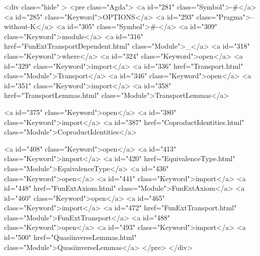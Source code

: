   <div class="hide" >
<pre class="Agda">
<a id="281" class="Symbol">{-#</a> <a id="285" class="Keyword">OPTIONS</a> <a id="293" class="Pragma">--without-K</a> <a id="305" class="Symbol">#-}</a>
<a id="309" class="Keyword">module</a> <a id="316" href="FunExtTransportDependent.html" class="Module">_</a> <a id="318" class="Keyword">where</a>
<a id="324" class="Keyword">open</a> <a id="329" class="Keyword">import</a> <a id="336" href="Transport.html" class="Module">Transport</a>
<a id="346" class="Keyword">open</a> <a id="351" class="Keyword">import</a> <a id="358" href="TransportLemmas.html" class="Module">TransportLemmas</a>

<a id="375" class="Keyword">open</a> <a id="380" class="Keyword">import</a> <a id="387" href="CoproductIdentities.html" class="Module">CoproductIdentities</a>

<a id="408" class="Keyword">open</a> <a id="413" class="Keyword">import</a> <a id="420" href="EquivalenceType.html" class="Module">EquivalenceType</a>
<a id="436" class="Keyword">open</a> <a id="441" class="Keyword">import</a> <a id="448" href="FunExtAxiom.html" class="Module">FunExtAxiom</a>
<a id="460" class="Keyword">open</a> <a id="465" class="Keyword">import</a> <a id="472" href="FunExtTransport.html" class="Module">FunExtTransport</a>
<a id="488" class="Keyword">open</a> <a id="493" class="Keyword">import</a> <a id="500" href="QuasiinverseLemmas.html" class="Module">QuasiinverseLemmas</a>
</pre>
</div>

